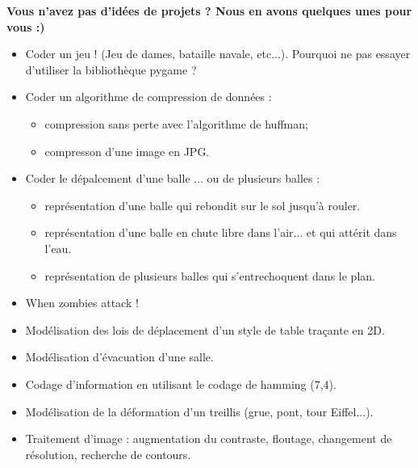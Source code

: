 \documentclass[10pt,fleqn]{article} %
\begin{document}
\textbf{Vous n'avez pas d'idées de projets ? Nous en avons quelques unes pour vous :)}
\begin{itemize}
\item Coder un jeu ! (Jeu de dames, bataille navale, etc...). Pourquoi ne pas essayer d'utiliser la bibliothèque pygame ?
\item Coder un algorithme de compression de données : 
\begin{itemize}
\item compression sans perte avec l'algorithme de huffman;
\item compresson d'une image en JPG.
\end{itemize}
\item Coder le dépalcement d'une balle ... ou de plusieurs balles :
\begin{itemize}
\item représentation d'une balle qui rebondit sur le sol jusqu'à rouler.
\item représentation d'une balle en chute libre dans l'air... et qui attérit dans l'eau.
\item représentation de plusieurs balles qui s'entrechoquent dans le plan.
\end{itemize}
\item When zombies attack !
\item Modélisation des lois de déplacement d'un style de table traçante en 2D.
\item Modélisation d'évacuation d'une salle.
\item Codage d'information en utilisant le codage de hamming (7,4).
\item Modélisation de la déformation d'un treillis (grue, pont, tour Eiffel...).
\item Traitement d'image : augmentation du contraste, floutage, changement de résolution,
recherche de contours.
\end{itemize}





\newpage
\def\columnseprulecolor{\color{ocre}}
\setlength{\columnseprule}{0.4pt} 
\end{document}
